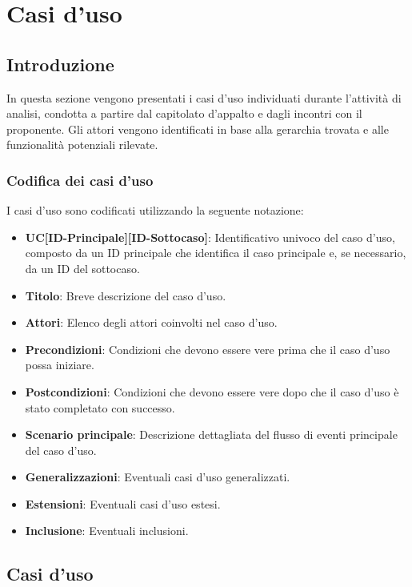 \section{Casi d'uso}
\subsection{Introduzione}
In questa sezione vengono presentati i casi d'uso individuati durante l'attività di analisi, 
condotta a partire dal capitolato d'appalto e dagli incontri con il proponente. 
Gli attori vengono identificati in base alla gerarchia trovata e 
alle funzionalità potenziali rilevate.

\subsubsection{Codifica dei casi d'uso}
I casi d'uso sono codificati utilizzando la seguente notazione:

\begin{itemize}
    \item \textbf{UC[ID-Principale][ID-Sottocaso]}: Identificativo univoco del caso d'uso, composto da un ID principale che identifica il caso principale e, se necessario, da un ID del sottocaso.
    \item \textbf{Titolo}: Breve descrizione del caso d'uso.
    \item \textbf{Attori}: Elenco degli attori coinvolti nel caso d'uso.
    \item \textbf{Precondizioni}: Condizioni che devono essere vere prima che il caso d'uso possa iniziare.
    \item \textbf{Postcondizioni}: Condizioni che devono essere vere dopo che il caso d'uso è stato completato con successo.
    \item \textbf{Scenario principale}: Descrizione dettagliata del flusso di eventi principale del caso d'uso.
    \item \textbf{Generalizzazioni}: Eventuali casi d'uso generalizzati.
    \item \textbf{Estensioni}: Eventuali casi d'uso estesi.
    \item \textbf{Inclusione}: Eventuali inclusioni.
\end{itemize}
\newpage
\subsection{Casi d'uso}

